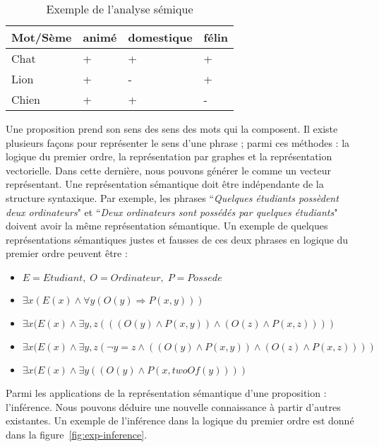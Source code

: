 \documentclass{KodeBook}
\begin{document}
\begin{table}[ht]
	\centering
	\begin{tabular}{|l|l|l|l|}
		\hline
		Mot/Sème & animé & domestique & félin \\
		\hline
		Chat & + & + & + \\
		\hline
		Lion & + & - & + \\
		\hline
		Chien & + & + & - \\
		\hline
	\end{tabular}
	\caption[Exemple de l'analyse sémique]{Exemple de l'analyse sémique \label{tab:semique}}
\end{table}

Une proposition prend son sens des sens des mots qui la composent. 
Il existe plusieurs façons pour représenter le sens d'une phrase ; parmi ces méthodes : la logique du premier ordre, la représentation par graphes et la représentation vectorielle.
Dans cette dernière, nous pouvons générer le  comme un vecteur représentant. 
Une représentation sémantique doit être indépendante de la structure syntaxique.
Par exemple, les phrases ``\textit{Quelques étudiants possèdent deux ordinateurs}" et ``\textit{Deux ordinateurs sont possédés par quelques étudiants}" doivent avoir la même représentation sémantique. 
Un exemple de quelques représentations sémantiques justes et fausses de ces deux phrases en logique du premier ordre peuvent être :
\begin{itemize}
	\item $E = Etudiant, \; O = Ordinateur, \; P = Possede$
	\item $\exists x (E(x) \wedge \forall y ( O(y) \Rightarrow P(x, y)) )$ \textcolor{red}{\XBox}
	\item $\exists x (E(x) \wedge \exists y, z (( (O(y) \wedge P(x, y) ) \wedge (O(z) \wedge P(x, z) ) ))$ \textcolor{red}{\XBox}
	\item $\exists x (E(x) \wedge \exists y, z (\neg y = z \wedge ( (O(y) \wedge P(x, y) ) \wedge (O(z) \wedge P(x, z) ) ))$ \textcolor{olivegreen}{\CheckedBox}
	\item $\exists x (E(x) \wedge \exists y ((O(y) \wedge P(x, twoOf(y)) ))$ \textcolor{olivegreen}{\CheckedBox}
\end{itemize}
Parmi les applications de la représentation sémantique d'une proposition : l'inférence. 
Nous pouvons déduire une nouvelle connaissance à partir d'autres existantes. 
Un exemple de l'inférence dans la logique du premier ordre est donné dans la figure~\ref{fig:exp-inference}.
\end{document}
